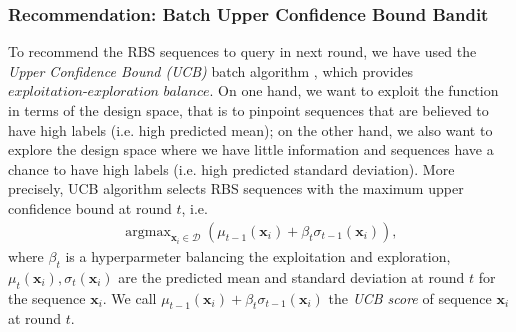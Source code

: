 
\subsubsection{Recommendation: Batch Upper Confidence Bound Bandit}

To recommend the RBS sequences to query in next round, we have used the \textit{Upper Confidence Bound (UCB)} batch algorithm \cite{srinivas2012information}, which provides  $\textit{exploitation-exploration balance}$.
On one hand, we want to exploit the function in terms of the design space, that is to pinpoint sequences that are believed to have high labels (i.e. high predicted mean); 
on the other hand, we also want to explore the design space where we have little information and sequences have a chance to have high labels (i.e. high predicted standard deviation).
More precisely, UCB algorithm selects RBS sequences with the maximum upper confidence bound at round $t$, i.e.
\begin{align}
\label{Eq: GPUCB}
    \operatorname{argmax}_{\mathbf{x}_i \in \mathcal{D}} \left( \mu_{t-1}(\mathbf{x}_i) + \beta_t \sigma_{t-1}(\mathbf{x}_i)\right),
\end{align}
where $\beta_t$ is a hyperparmeter balancing the exploitation and exploration, 
$\mu_t(\mathbf{x}_i), \sigma_t(\mathbf{x}_i)$ are the predicted mean and standard deviation at round $t$ for the sequence $\mathbf{x}_i$.
We call $\mu_{t-1}(\mathbf{x}_i) + \beta_t \sigma_{t-1}(\mathbf{x}_i)$ the \textit{UCB score} of sequence $\mathbf{x}_i$ at round $t$.

